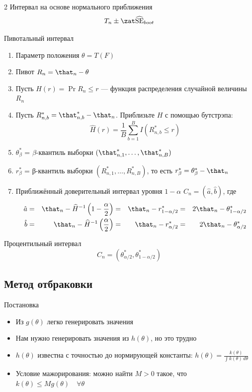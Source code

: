 \documentclass[landscape]{article}
\def\sehat{\ensuremath{\widehat{\mathrm{SE}}}}
\renewcommand{\cdf}{функция распределения\xspace}
\begin{document}
\begin{multicols*}{2}
Интервал на основе нормального приближения
\[T_n \pm \zat\sehat_{boot}\]

Пивотальный интервал
\begin{enumerate}
  \item Параметр положения $\theta = T(F)$
  \item Пивот $R_n = \that_n - \theta$
  \item Пусть $H(r) = \Pr{R_n \le r}$ — \cdf случайной величины $R_n$
  \item Пусть $R_{n,b}^* = \that_{n,b}^* - \that_n$.
    Приблизьте $H$ с помощью бутстрэпа:
    \[\widehat{H}(r) = \frac{1}{B}\sum_{b=1}^B I(R_{n,b}^* \le r)\]
  \item $\theta_\beta^*$ = $\beta$-квантиль выборки
    $(\that_{n,1}^*,\dots,\that_{n,B}^*)$
  \item $r_\beta^*$ = β-квантиль выборки
    $(R_{n,1}^*,\dots,R_{n,B}^*)$, то есть
    $r_\beta^* = \theta_\beta^* - \that_n$
  \item Приближённый доверительный интервал уровня $1-\alpha$
    $C_n = \left( \hat{a}, \hat{b} \right)$, где
    \begin{align*}
    \hat{a}
      &=& \that_n - \widehat{H}^{-1}\left( 1-\frac{\alpha}{2} \right)
      &=& \that_n - r_{1-\alpha/2}^*
      &=& 2\that_n - \theta_{1-\alpha/2}^* \\
    \hat{b}
      &=& \that_n - \widehat{H}^{-1}\left( \frac{\alpha}{2} \right)
      &=& \that_n - r_{\alpha/2}^*
      &=& 2\that_n - \theta_{\alpha/2}^*
    \end{align*}
\end{enumerate}

Процентильный интервал
\[C_n = \left( \theta_{\alpha/2}^*, \theta_{1-\alpha/2}^* \right)\]

\subsection{Метод отбраковки}
Постановка
\begin{itemize}
  \item Из $g(\theta)$ легко генерировать значения
  \item Нам нужно генерировать значения из $h(\theta)$, но это трудно
  \item $h(\theta)$ известна с точностью до нормирующей константы:
    $h(\theta) = \displaystyle\frac{k(\theta)}{\int k(\theta)\,d\theta}$
  \item Условие мажорирования: можно найти $M > 0$ такое, что
    $k(\theta) \le Mg(\theta) \quad \forall \theta$
\end{itemize}


\end{multicols*}
\end{document}
